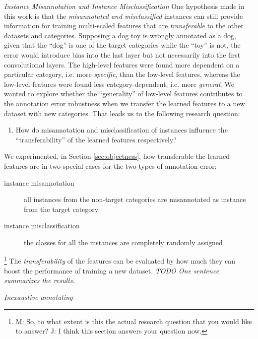 \noindent
\textit{Instance Misannotation and Instance Misclassification}
\noindent
One hypothesis made in this work is that the \textit{misannotated and misclassified} instances can still provide information for training multi-scaled features that are \textit{transferable}\cite{yosinski2014transferable} to the other datasets and categories.
Supposing a dog toy is wrongly annotated as a dog, given that the ``dog'' is one of the target categories while the ``toy'' is not, the error would introduce bias into the last layer but not necessarily into the first convolutional layers.
The high-level features were found more dependent on a  particular category, i.e. more \textit{specific}, than the low-level features, whereas the low-level features were found less category-dependent, i.e. more \textit{general}. \cite{yosinski2014transferable}
We wanted to explore whether the ``generality'' of low-level features contributes to the annotation error robustness when we transfer the learned features to a new dataset with new categories.
That leads us to the following research question:
\begin{enumerate}
  \item How do misannotation and misclassification of instances influence the ``transferability'' of the learned features respectively?
\end{enumerate}
We experimented, in Section \ref{sec:objectness}, how transferable the learned features are in two special cases for the two types of annotation error:
\begin{description}
  \item [instance misannotation] all instances from the non-target categories are misannotated as instance from the target category
  \item [instance misclassification] the classes for all the instances are completely randomly assigned
\end{description}
\footnote{M: So, to what extent is this the actual research question that you would like to answer? J: I think this section answers your question now.}
The \textit{transferability} of the features can be evaluated by how much they can boost the performance of training a new dataset. \cite{yosinski2014transferable}
\textit{TODO One sentence summarizes the results.}

\noindent
\textit{Inexaustive annotating}

